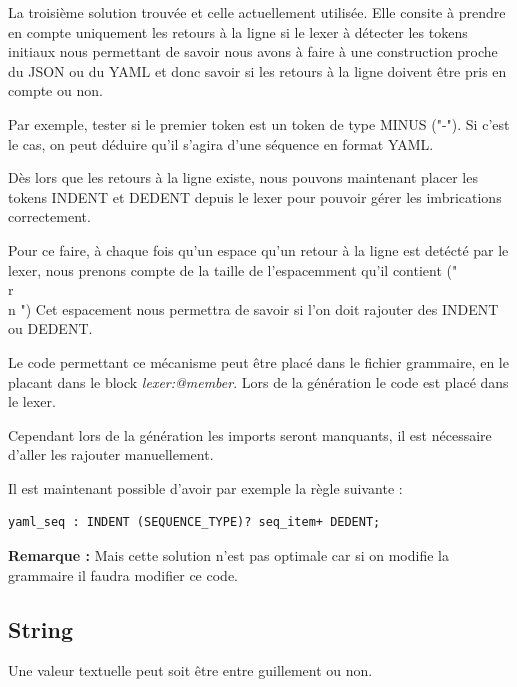 \documentclass[
    iict, %
    il, %
]{heig-tb}
\begin{document}
La troisième solution trouvée et celle actuellement utilisée. Elle consite à prendre en compte uniquement les retours à la ligne si le lexer à détecter les tokens initiaux
nous permettant de savoir nous avons à faire à une construction proche du JSON ou du YAML et donc savoir si les retours à la ligne doivent être pris en compte ou non.

Par exemple, tester si le premier token est un token de type MINUS ("-"). Si c'est le cas, on peut déduire qu'il s'agira d'une séquence en format YAML.

Dès lors que les retours à la ligne existe, nous pouvons maintenant placer les tokens INDENT et DEDENT depuis le lexer
pour pouvoir gérer les imbrications correctement.

Pour ce faire, à chaque fois qu'un espace qu'un retour à la ligne est detécté par le lexer, nous prenons compte de la taille de l'espacemment qu'il contient ("\\r\\n    ")
Cet espacement nous permettra de savoir si l'on doit rajouter des INDENT ou DEDENT.

Le code permettant ce mécanisme peut être placé dans le fichier grammaire, en le placant dans le block \emph{lexer:@member{}}.
Lors de la génération le code est placé dans le lexer.

Cependant lors de la génération les imports seront manquants, il est nécessaire d'aller les rajouter manuellement.



Il est maintenant possible d'avoir par exemple la règle suivante :

\begin{lstlisting}[frame=single,caption={generator-code},label={generator-code}]
    yaml_seq : INDENT (SEQUENCE_TYPE)? seq_item+ DEDENT;
\end{lstlisting}

\textbf{Remarque : } Mais cette solution n'est pas optimale car si on modifie la grammaire il faudra modifier ce code.

\subsection{String}
Une valeur textuelle peut soit être entre guillement ou non.
\end{document}
